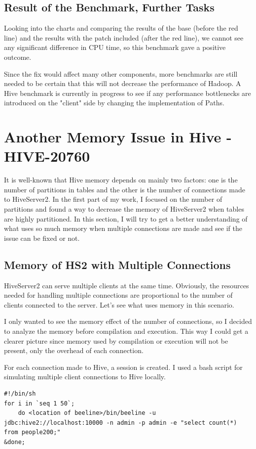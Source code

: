 \section{Result of the Benchmark, Further Tasks}
Looking into the charts and comparing the results of the base (before the red line) and the results with the patch included (after the red line), we cannot see any significant difference in CPU time, so this benchmark gave a positive outcome. 

Since the fix would affect many other components, more benchmarks are still needed to be certain that this will not decrease the performance of Hadoop. A Hive benchmark is currently in progress to see if any performance bottlenecks are introduced on the "client" side by changing the implementation of Paths.

\chapter{Another Memory Issue in Hive - HIVE-20760}
It is well-known that Hive memory depends on mainly two factors: one is the number of partitions in tables and the other is the number of connections made to HiveServer2. In the first part of my work, I focused on the number of partitions and found a way to decrease the memory of HiveServer2 when tables are highly partitioned. In this section, I will try to get a better understanding of what uses so much memory when multiple connections are made and see if the issue can be fixed or not. 

\section{Memory of HS2 with Multiple Connections}
HiveServer2 can serve multiple clients at the same time. Obviously, the resources needed for handling multiple connections are proportional to the number of clients connected to the server. Let's see what uses memory in this scenario.

I only wanted to see the memory effect of the number of connections, so I decided to analyze the memory before compilation and execution. This way I could get a clearer picture since memory used by compilation or execution will not be present, only the overhead of each connection. 

For each connection made to Hive, a session is created. I used a bash script for simulating multiple client connections to Hive locally. 

\begin{lstlisting}
#!/bin/sh
for i in `seq 1 50`; 
	do <location of beeline>/bin/beeline -u jdbc:hive2://localhost:10000 -n admin -p admin -e "select count(*) from people200;" 
&done;	
\end{lstlisting}

